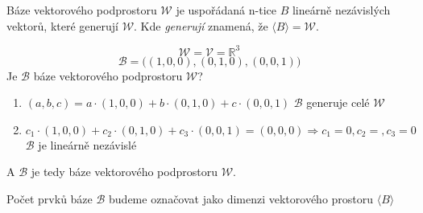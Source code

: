 \begin{definition}
    Báze vektorového podprostoru $\mathcal{W}$ je uspořádaná n-tice $B$ lineárně
    nezávislých vektorů, které generují $\mathcal{W}$.
    Kde \textit{generují} znamená, že $\langle B \rangle = \mathcal{W}$.
\end{definition}

\begin{example}
    $$\mathcal{W} = \mathcal{V} = \mathbb{R}^3$$
    $$\mathcal{B} = \big((1, 0, 0), (0, 1, 0), (0, 0, 1)\big)$$
    Je $\mathcal{B}$ báze vektorového podprostoru $\mathcal{W}$?
    \begin{enumerate}
        \item $(a, b, c) = a \cdot(1, 0, 0) + b \cdot (0, 1, 0) + c \cdot (0, 0, 1)$ \hfill
            $\mathcal{B}$ generuje celé $\mathcal{W}$
        \item $c_1 \cdot(1, 0, 0) + c_2 \cdot (0, 1, 0) + c_3 \cdot (0, 0, 1) = (0, 0, 0)
            \Rightarrow c_1 = 0, c_2 =, c_3 = 0$ \hfill $\mathcal{B}$ je lineárně nezávislé
    \end{enumerate}
    A $\mathcal{B}$ je tedy báze vektorového podprostoru $\mathcal{W}$.
\end{example}

\begin{definition}
    Počet prvků báze $\mathcal{B}$ budeme označovat jako dimenzi vektorového
        prostoru $\langle B \rangle$
\end{definition}

